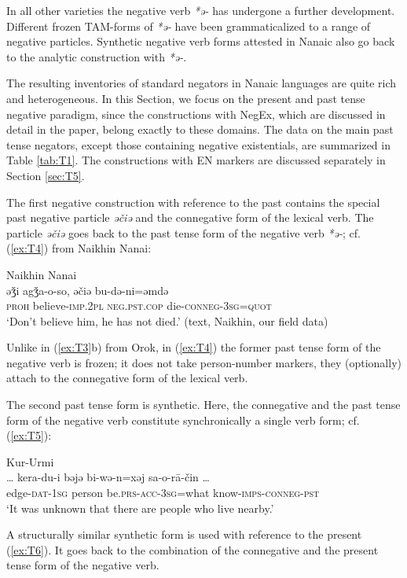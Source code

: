 \documentclass[output=paper]{langscibook}
\begin{document}
In all other varieties the negative verb \textit{*ə-} has undergone a further development. Different frozen TAM-forms of \textit{*ə-} have been grammaticalized to a range of negative particles. Synthetic negative verb forms attested in Nanaic also go back to the analytic construction with \textit{*ə-}.

The resulting inventories of standard negators in Nanaic languages are quite rich and heterogeneous. In this Section, we focus on the present and past tense negative paradigm, since the constructions with NegEx, which are discussed in detail in the paper, belong exactly to these domains. The data on the main past tense negators, except those containing negative existentials, are summarized in Table \ref{tab:T1}. The constructions with EN markers are discussed separately in Section \ref{sec:T5}.

The first negative construction with reference to the past contains the special past negative particle \textit{əčiə} and the connegative form of the lexical verb. The particle \textit{əčiə} goes back to the past tense form of the negative verb \textit{*ə-}; cf. (\ref{ex:T4}) from Naikhin Nanai:

\ea Naikhin Nanai \label{ex:T4}\\
	\gll əǯi		agǯa-o-so,			əčiə				bu-də-ni=əmdə\\
	\textsc{proh}	believe-\textsc{imp.2pl}	\textsc{neg.pst.cop}	die-\textsc{conneg-3sg=quot}\\
	\glt `Don’t believe him, he has not died.' (text, Naikhin, our field data)
\z

Unlike in (\ref{ex:T3}b) from Orok, in (\ref{ex:T4}) the former past tense form of the negative verb is frozen; it does not take person-number markers, they (optionally) attach to the connegative form of the lexical verb.

The second past tense form is synthetic. Here, the connegative and the past tense form of the negative verb constitute synchronically a single verb form; cf. (\ref{ex:T5}):

\ea Kur-Urmi \label{ex:T5}\\
	\gll … kera-du-i	bəjə	bi-wə-n=xəj	{sa-o-rā-čin …}\\
	{} edge-\textsc{dat-1sg}	person	be.\textsc{prs-acc-3sg}=what	know-\textsc{imps-conneg-pst} {}\\
	\glt `It was unknown that there are people who live nearby.' \citep[145, text]{sunik1958a}
\z

A structurally similar synthetic form is used with reference to the present (\ref{ex:T6}). It goes back to the combination of the connegative and the present tense form of the negative verb.
\end{document}
